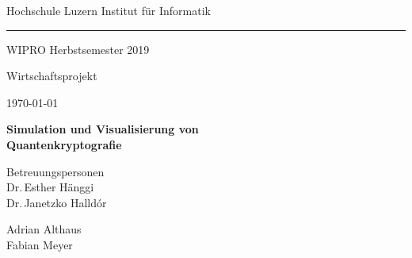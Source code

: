 \documentclass[a4paper,10.2pt,pdftex]{scrartcl}%
\begin{document}
\begin{titlepage} 
 \begin{center} 
    \thispagestyle{empty}
  {\small  Hochschule Luzern \hfill Institut für Informatik   \\[.75ex]
\hrule 
\vspace{0.75ex}
WIPRO  \hfill Herbstsemester 2019\\  

}


\vspace{14ex}



{\LARGE Wirtschaftsprojekt}


\vspace{2ex}

{\large \today}\\
\vspace{2ex}



\vspace{9ex}


{\huge\bfseries\textsf{Simulation und Visualisierung von \\[-1mm] Quantenkryptografie \\[5.5mm] }}



\vspace{5ex}

Betreuungspersonen \\[2mm] Dr.\,Esther Hänggi \\ Dr.\,Janetzko Halldór\\[3mm]


\vspace{8ex}

{\Large Adrian Althaus \\[2mm] Fabian Meyer  \Large {}}

\vspace{8ex}


 

\end{center}
\end{titlepage}

\vspace*{1ex}
\thispagestyle{plain}
\tableofcontents
\newpage
\end{document}
